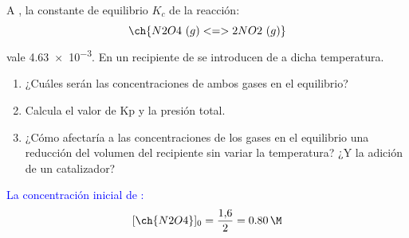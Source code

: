 \begin{exerciseEVAU}
\begin{solu}
    \end{solu}
\end{exerciseEVAU}


\begin{exerciseEVAU}
    A , la constante de equilibrio \(K_c\) de la reacción:
    \begin{equation*}
        \ch{N2O4\ (g) <=> 2 NO2\ (g)}
    \end{equation*}
    vale \num{4,63e-3}.
    En un recipiente de  se introducen  de  a dicha temperatura.
    \begin{enumerate}[label=\letraminuscula]
        \item ¿Cuáles serán las concentraciones de ambos gases en el equilibrio?
        \item Calcula el valor de Kp y la presión total.
        \item ¿Cómo afectaría a las concentraciones de los gases en el equilibrio una reducción del volumen del recipiente sin variar la temperatura? ¿Y la adición de un catalizador?
    \end{enumerate}

    \begin{solu}

    \textcolor{blue}{La concentración inicial de :}
    \[
        [\ch{N2O4}]_0 = \frac{1{,}6}{2} = \qty{0{,}80}{\M}
    \]


\end{solu}
\end{exerciseEVAU}
